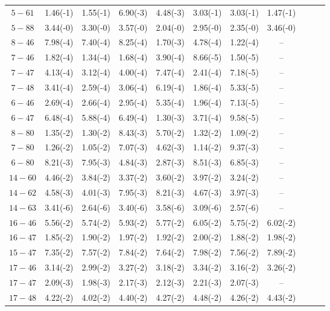 \begin{table}
\begin{center}
\begin{tabular}{@{} l *8c *2c @{}}
 \multicolumn{1}{c}{ $5 - 61$} & 1.46(-1) & 1.55(-1)  & 6.90(-3) & 4.48(-3) &3.03(-1)  & 3.03(-1) & 1.47(-1) \\
 \multicolumn{1}{c}{ $5 - 88$} &  3.44(-0) & 3.30(-0)  & 3.57(-0) & 2.04(-0) & 2.95(-0) & 2.35(-0) & 3.46(-0) \\
 \multicolumn{1}{c}{ $8- 46$} &    7.98(-4) & 7.40(-4) & 8.25(-4) & 1.70(-3) &  4.78(-4) & 1.22(-4) & -- \\
 \multicolumn{1}{c}{ $7 - 46$} &   1.82(-4) & 1.34(-4) & 1.68(-4) & 3.90(-4) & 8.66(-5) & 1.50(-5) & -- \\
 \multicolumn{1}{c}{ $7 - 47$} &    4.13(-4) & 3.12(-4) & 4.00(-4) & 7.47(-4) & 2.41(-4) & 7.18(-5) & -- \\
 
 \multicolumn{1}{c}{ $7 - 48$} &  3.41(-4) & 2.59(-4)  & 3.06(-4) & 6.19(-4) & 1.86(-4) & 5.33(-5) & -- \\
 \multicolumn{1}{c}{ $6 - 46$} &  2.69(-4) &2.66(-4)& 2.95(-4) & 5.35(-4) & 1.96(-4) & 7.13(-5) & -- \\
 \multicolumn{1}{c}{ $6 - 47$} &   6.48(-4) &5.88(-4) & 6.49(-4) & 1.30(-3) & 3.71(-4) & 9.58(-5) & -- \\
 \multicolumn{1}{c}{ $8 - 80$} &    1.35(-2) & 1.30(-2)& 8.43(-3) & 5.70(-2) & 1.32(-2) & 1.09(-2) & -- \\
 \multicolumn{1}{c}{ $7 - 80$} &   1.26(-2) & 1.05(-2)  &  7.07(-3) & 4.62(-3) &1.14(-2) & 9.37(-3) & -- \\
 
 \multicolumn{1}{c}{ $6 - 80$} &  8.21(-3) & 7.95(-3) & 4.84(-3) & 2.87(-3) &8.51(-3) & 6.85(-3) & -- \\
 \multicolumn{1}{c}{ $14 - 60$} &    4.46(-2) &3.84(-2)   & 3.37(-2) & 3.60(-2) &3.97(-2)  & 3.24(-2) & -- \\
 \multicolumn{1}{c}{ $14 - 62$} &    4.58(-3) &4.01(-3) & 7.95(-3) & 8.21(-3) & 4.67(-3) & 3.97(-3) & -- \\
 \multicolumn{1}{c}{ $14 - 63$} &    3.41(-6) & 2.64(-6)  & 3.40(-6) & 3.58(-6) & 3.09(-6) &2.57(-6) & -- \\
 \multicolumn{1}{c}{ $16 - 46$} &    5.56(-2) & 5.74(-2)& 5.93(-2) & 5.77(-2) & 6.05(-2) & 5.75(-2) & 6.02(-2) \\
 
 \multicolumn{1}{c}{ $16 - 47$} &  1.85(-2) & 1.90(-2)& 1.97(-2) & 1.92(-2) & 2.00(-2) & 1.88(-2) &  1.98(-2)\\
 \multicolumn{1}{c}{ $15 - 47$} &    7.35(-2) & 7.57(-2)  & 7.84(-2) & 7.64(-2) & 7.98(-2)  & 7.56(-2) & 7.89(-2) \\
 \multicolumn{1}{c}{ $17 - 46$} &  3.14(-2) & 2.99(-2) & 3.27(-2) & 3.18(-2) & 3.34(-2) & 3.16(-2) &  3.26(-2) \\
 \multicolumn{1}{c}{ $17 - 47$} &    2.09(-3) & 1.98(-3) & 2.17(-3) & 2.12(-3) & 2.21(-3) & 2.07(-3) & -- \\
 \multicolumn{1}{c}{ $17 - 48$} &    4.22(-2) & 4.02(-2) & 4.40(-2) & 4.27(-2) & 4.48(-2) & 4.26(-2) & 4.43(-2) \\


\end{tabular}
\end{center}
\end{table}
